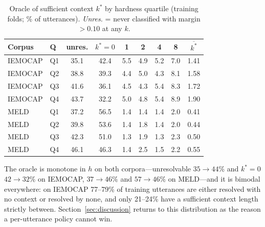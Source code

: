 \documentclass[journal]{IEEEtran}
\begin{document}
\begin{table}[t]\centering\footnotesize\setlength{\tabcolsep}{3pt}
\caption{Oracle of sufficient context $k^*$ by hardness quartile (training folds; \% of utterances). \emph{Unres.} = never classified with margin $> 0.10$ at any $k$.}\label{tab:oracle}
\begin{tabular}{llccccccc}\toprule
Corpus & Q & unres. & $k^*{=}0$ & 1 & 2 & 4 & 8 & $\overline{k^*}$ \\ \midrule
IEMOCAP & Q1 & 35.1 & 42.4 & 5.5 & 4.9 & 5.2 & 7.0 & 1.41 \\
IEMOCAP & Q2 & 38.8 & 39.3 & 4.4 & 5.0 & 4.3 & 8.1 & 1.58 \\
IEMOCAP & Q3 & 41.6 & 36.1 & 4.5 & 4.3 & 5.4 & 8.3 & 1.72 \\
IEMOCAP & Q4 & 43.7 & 32.2 & 5.0 & 4.8 & 5.4 & 8.9 & 1.90 \\ \midrule
MELD & Q1 & 37.2 & 56.5 & 1.4 & 1.4 & 1.4 & 2.0 & 0.41 \\
MELD & Q2 & 39.8 & 53.6 & 1.4 & 1.8 & 1.4 & 2.0 & 0.44 \\
MELD & Q3 & 42.3 & 51.0 & 1.3 & 1.9 & 1.3 & 2.3 & 0.50 \\
MELD & Q4 & 46.1 & 46.3 & 1.4 & 2.5 & 1.5 & 2.2 & 0.55 \\ \bottomrule
\end{tabular}
\end{table}

The oracle is monotone in $h$ on both corpora---unresolvable $35 \rightarrow 44\%$ and $k^*{=}0$ $42 \rightarrow 32\%$ on IEMOCAP, $37 \rightarrow 46\%$ and $57 \rightarrow 46\%$ on MELD---and it is bimodal everywhere: on IEMOCAP 77--79\% of training utterances are either resolved with no context or resolved by none, and only 21--24\% have a sufficient context length strictly between. Section~\ref{sec:discussion} returns to this distribution as the reason a per-utterance policy cannot win.
\end{document}
